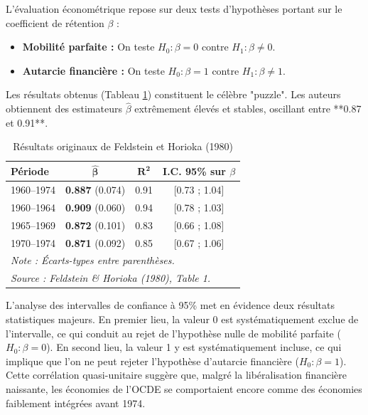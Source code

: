 \documentclass[12pt, a4paper]{article}
\begin{document}
L'évaluation économétrique repose sur deux tests d'hypothèses portant sur le coefficient de rétention $\beta$ :
\begin{itemize}
    \item \textbf{Mobilité parfaite :} On teste $H_0 : \beta = 0$ contre $H_1 : \beta \neq 0$.
    \item \textbf{Autarcie financière :} On teste $H_0 : \beta = 1$ contre $H_1 : \beta \neq 1$.
\end{itemize}

Les résultats obtenus (Tableau \ref{tab:FH1980}) constituent le célèbre "puzzle". Les auteurs obtiennent des estimateurs $\hat{\beta}$ extrêmement élevés et stables, oscillant entre **0.87 et 0.91**.

\begin{table}[H]
    \centering
    \caption{Résultats originaux de Feldstein et Horioka (1980)}
    \label{tab:FH1980}
    \begin{tabular}{lccc}
        \toprule
        \textbf{Période} & $\boldsymbol{\hat{\beta}}$ & $\boldsymbol{R^2}$ & \textbf{I.C. 95\% sur $\beta$} \\
        \midrule
        1960--1974 & \textbf{0.887} (0.074) & 0.91 & [0.73 ; 1.04] \\
        1960--1964 & \textbf{0.909} (0.060) & 0.94 & [0.78 ; 1.03] \\
        1965--1969 & \textbf{0.872} (0.101) & 0.83 & [0.66 ; 1.08] \\
        1970--1974 & \textbf{0.871} (0.092) & 0.85 & [0.67 ; 1.06] \\
        \bottomrule
        \multicolumn{4}{l}{\footnotesize \textit{Note : Écarts-types entre parenthèses.}} \\
        \multicolumn{4}{l}{\footnotesize \textit{Source : Feldstein \& Horioka (1980), Table 1.}} \\
    \end{tabular}
\end{table}

L'analyse des intervalles de confiance à 95\% met en évidence deux résultats statistiques majeurs. En premier lieu, la valeur 0 est systématiquement exclue de l'intervalle, ce qui conduit au rejet de l'hypothèse nulle de mobilité parfaite ($H_0 : \beta = 0$). En second lieu, la valeur 1 y est systématiquement incluse, ce qui implique que l'on ne peut rejeter l'hypothèse d'autarcie financière ($H_0 : \beta = 1$).
Cette corrélation quasi-unitaire suggère que, malgré la libéralisation financière naissante, les économies de l'OCDE se comportaient encore comme des économies faiblement intégrées avant 1974.
\end{document}

